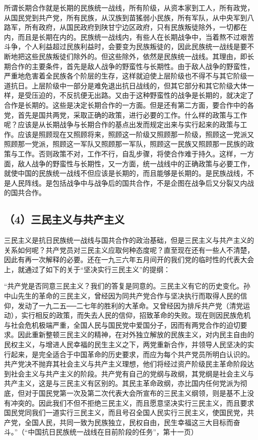 所谓长期合作就是长期的民族统一战线，所有阶级，从资本家到工人，所有政党，从国民党到共产党，所有民族，从汉族到苗猺弱小民族，所有军队，从中央军到八路军，所有政府，从国民政府到陕甘宁边区政府，只有民族叛徒除外，一切都在内，而且是长期在内的。民族统一战线内，有些人在长期战争中，当着熬不过艰苦斗争，个人利益超过民族利益时，会要变为民族叛徒的，因此民族统一战线是要不断地把这些民族叛徒们除外的。但这些除外，依然是民族统一战线。其理由，即长期合作的主要条件，首先是敌人战争的野蛮性与长期性。由于敌人战争的野蛮性，严重地危害着全民族各个阶层的生存，这样就迫使上层阶级也不得不与其它阶级一道抗日。上层阶级中一部分是难免退出抗日战线的，但其它部分和其它阶级大体一样，是受压迫的，不反抗便无出路。又由于这种野蛮性的战争是长期的，就决定了合作是长期的。这些是决定长期合作的一方面。但是还有第二方面，要合作中的各党，首先是国共两党，采取正确的政策，进行必要的工作。什么样的政策与工作呢？应该是从长期战争与长期合作的基点出发而规定出来与实行起来的政策与工作。应该是照顾现在又照顾将来，照顾这一阶级又照顾那一阶级，照顾这一党派又照顾那一党派，照顾这一军队又照顾那一军队，照顾这一民族又照顾那一民族的政策与工作。否则政策不对，工作不行，自乱步骤，将使合作难于持久。这样，一方面，敌人战争的野蛮性与长期性，又一方面，统一战线中的正确政策与必要工作，就使中国的民族统一战线不但应该是长期的，而且能够是长期的。是民族战线，不是人民阵线。是包括战争中与战争后的国共合作，不是企图在战争后又分裂又内战的国共合作。

\subsection{（4）三民主义与共产主义}

三民主义是抗日民族统一战线与国共合作的政治基础，但是三民主义与共产主义的关系如何呢？共产党员对三民主义应取何种态度呢？直至现在还有一些人不清楚，因此有再一次解释的必要。还在一九三六年五月间开的我们党的临时性的代表大会上，就通过了如下的关于“坚决实行三民主义”的提纲：

“共产党是否同意三民主义？我们的答复是同意的。三民主义有它的历史变化。孙中山先生的革命的三民主义，曾经因为同共产党合作与坚决执行而取得人民的信仰，发动了一九二五──二七年的胜利的大革命。又曾经因为排斥共产党（清党运动），实行相反的政策，而失去人民的信仰，招致革命的失败。现在则因民族危机与社会危机极端严重，全国人民与国民党中爱国分子，因而有两党合作的迫切要求。因此重新整顿三民主义的精神，在对外独立解放的民族主义，对内民主自由的民权主义，与增进人民幸福的民生主义之下，两党重新合作，并领导人民坚决的实行起来，是完全适合于中国革命的历史要求，而应为每个共产党员所明白认识的。共产党决不抛弃其社会主义与共产主义理想，他们将经过资产阶级民主革命阶段达到社会主义与共产主义的阶段。共产党有自己的党纲与政纲，其党纲是社会主义与共产主义，这是与三民主义有区别的。其民主革命政纲，亦比国内任何党派为彻底，但对于国民党第一次及第二次代表大会所宣布的三民主义纲领，则是基不上没有冲突的。因此我们不但不拒绝三民主义，而且愿意坚决实行三民主义，而且要求国民党同我们一道实行三民主义，而且号召全国人民实行三民主义，使国民党，共产党，全国人民，共同一致为民族独立，民权自由，民生幸福这三大目标而奋斗。”（“中国抗日民族统一战线在目前阶段的任务”，第十一页）

